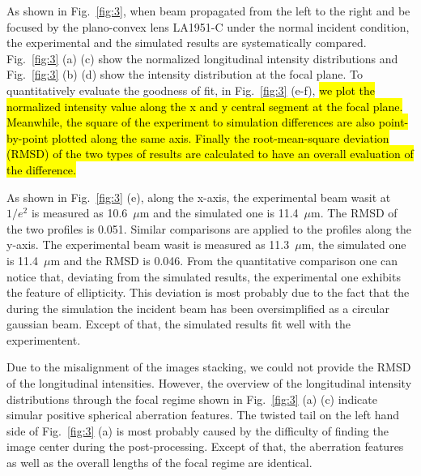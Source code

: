 \documentclass[9pt,twocolumn,twoside]{osajnl}
\begin{document}
As shown in Fig.~\ref{fig:3}, when beam propagated from the left to the right and be focused by the plano-convex lens LA1951-C under the normal incident condition, the experimental and the simulated results are systematically compared. Fig.~\ref{fig:3} (a) (c) show the normalized longitudinal intensity distributions and Fig.~\ref{fig:3} (b) (d) show the intensity distribution at the focal plane. To quantitatively evaluate the goodness of fit, in Fig.~\ref{fig:3} (e-f), \hl{we plot the normalized intensity value along the x and y central segment at the focal plane. Meanwhile, the square of the experiment to simulation differences are also point-by-point plotted along the same axis. Finally the root-mean-square deviation (RMSD) of the two types of results are calculated to have an overall evaluation of the difference.}

As shown in Fig.~\ref{fig:3} (e), along the x-axis, the experimental beam wasit at $1/e^2$ is measured as 10.6~$\mu$m and the simulated one is 11.4~$\mu$m. The RMSD of the two profiles is 0.051. Similar comparisons are applied to the profiles along the y-axis. The experimental beam wasit is measured as 11.3~$\mu$m, the simulated one is 11.4~$\mu$m and the RMSD is 0.046. From the quantitative comparison one can notice that, deviating from the simulated results, the experimental one exhibits the feature of ellipticity. This deviation is most probably due to the fact that the during the simulation the incident beam has been oversimplified as a circular gaussian beam. Except of that, the simulated results fit well with the experimentent. 

Due to the misalignment of the images stacking, we could not provide the RMSD of the longitudinal intensities. However, the overview of the longitudinal intensity distributions through the focal regime shown in Fig.~\ref{fig:3} (a) (c) indicate simular positive spherical aberration features. The twisted tail on the left hand side of Fig.~\ref{fig:3} (a) is most probably caused by the difficulty of finding the image center during the post-processing. Except of that, the aberration features as well as the overall lengths of the focal regime are identical.
\end{document}
